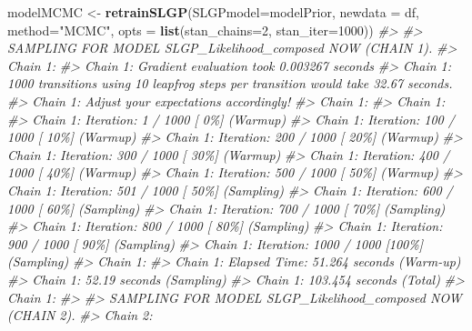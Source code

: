 \documentclass[
]{article}
\newenvironment{Shaded}{\begin{snugshade}}{\end{snugshade}}
\newcommand{\AttributeTok}[1]{\textcolor[rgb]{0.13,0.29,0.53}{#1}}
\newcommand{\CommentTok}[1]{\textcolor[rgb]{0.56,0.35,0.01}{\textit{#1}}}
\newcommand{\DecValTok}[1]{\textcolor[rgb]{0.00,0.00,0.81}{#1}}
\newcommand{\FunctionTok}[1]{\textcolor[rgb]{0.13,0.29,0.53}{\textbf{#1}}}
\newcommand{\NormalTok}[1]{#1}
\newcommand{\OtherTok}[1]{\textcolor[rgb]{0.56,0.35,0.01}{#1}}
\newcommand{\StringTok}[1]{\textcolor[rgb]{0.31,0.60,0.02}{#1}}
\begin{document}
\begin{Shaded}
\begin{Highlighting}[]
\NormalTok{modelMCMC  }\OtherTok{\textless{}{-}} \FunctionTok{retrainSLGP}\NormalTok{(}\AttributeTok{SLGPmodel=}\NormalTok{modelPrior, }
                          \AttributeTok{newdata =}\NormalTok{ df, }
                          \AttributeTok{method=}\StringTok{"MCMC"}\NormalTok{,}
                          \AttributeTok{opts =} \FunctionTok{list}\NormalTok{(}\AttributeTok{stan\_chains=}\DecValTok{2}\NormalTok{, }\AttributeTok{stan\_iter=}\DecValTok{1000}\NormalTok{))}
\CommentTok{\#\textgreater{} }
\CommentTok{\#\textgreater{} SAMPLING FOR MODEL \textquotesingle{}SLGP\_Likelihood\_composed\textquotesingle{} NOW (CHAIN 1).}
\CommentTok{\#\textgreater{} Chain 1: }
\CommentTok{\#\textgreater{} Chain 1: Gradient evaluation took 0.003267 seconds}
\CommentTok{\#\textgreater{} Chain 1: 1000 transitions using 10 leapfrog steps per transition would take 32.67 seconds.}
\CommentTok{\#\textgreater{} Chain 1: Adjust your expectations accordingly!}
\CommentTok{\#\textgreater{} Chain 1: }
\CommentTok{\#\textgreater{} Chain 1: }
\CommentTok{\#\textgreater{} Chain 1: Iteration:   1 / 1000 [  0\%]  (Warmup)}
\CommentTok{\#\textgreater{} Chain 1: Iteration: 100 / 1000 [ 10\%]  (Warmup)}
\CommentTok{\#\textgreater{} Chain 1: Iteration: 200 / 1000 [ 20\%]  (Warmup)}
\CommentTok{\#\textgreater{} Chain 1: Iteration: 300 / 1000 [ 30\%]  (Warmup)}
\CommentTok{\#\textgreater{} Chain 1: Iteration: 400 / 1000 [ 40\%]  (Warmup)}
\CommentTok{\#\textgreater{} Chain 1: Iteration: 500 / 1000 [ 50\%]  (Warmup)}
\CommentTok{\#\textgreater{} Chain 1: Iteration: 501 / 1000 [ 50\%]  (Sampling)}
\CommentTok{\#\textgreater{} Chain 1: Iteration: 600 / 1000 [ 60\%]  (Sampling)}
\CommentTok{\#\textgreater{} Chain 1: Iteration: 700 / 1000 [ 70\%]  (Sampling)}
\CommentTok{\#\textgreater{} Chain 1: Iteration: 800 / 1000 [ 80\%]  (Sampling)}
\CommentTok{\#\textgreater{} Chain 1: Iteration: 900 / 1000 [ 90\%]  (Sampling)}
\CommentTok{\#\textgreater{} Chain 1: Iteration: 1000 / 1000 [100\%]  (Sampling)}
\CommentTok{\#\textgreater{} Chain 1: }
\CommentTok{\#\textgreater{} Chain 1:  Elapsed Time: 51.264 seconds (Warm{-}up)}
\CommentTok{\#\textgreater{} Chain 1:                52.19 seconds (Sampling)}
\CommentTok{\#\textgreater{} Chain 1:                103.454 seconds (Total)}
\CommentTok{\#\textgreater{} Chain 1: }
\CommentTok{\#\textgreater{} }
\CommentTok{\#\textgreater{} SAMPLING FOR MODEL \textquotesingle{}SLGP\_Likelihood\_composed\textquotesingle{} NOW (CHAIN 2).}
\CommentTok{\#\textgreater{} Chain 2: }

\end{Highlighting}
\end{Shaded}
\end{document}
